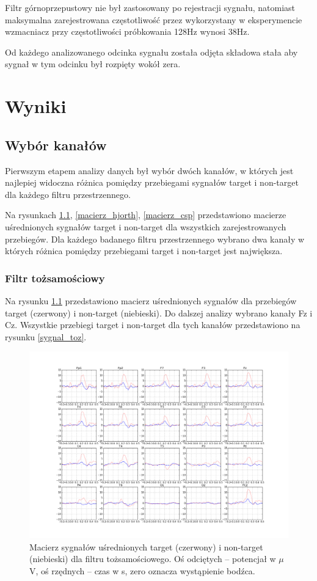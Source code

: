 \documentclass[licencjacka,openright]{pracamgr}
\begin{document}
Filtr górnoprzepustowy nie był zastosowany po rejestracji sygnału, natomiast maksymalna zarejestrowana częstotliwość przez wykorzystany w eksperymencie wzmacniacz przy częstotliwości próbkowania 128Hz wynosi 38Hz.

Od każdego analizowanego odcinka sygnału została odjęta składowa stała aby sygnał w tym odcinku był rozpięty wokół zera.

\chapter{Wyniki}
\label{wyniki}

\section{Wybór kanałów}
\label{sygnaly}

Pierwszym etapem analizy danych był wybór dwóch kanałów, w których jest najlepiej widoczna różnica pomiędzy przebiegami sygnałów target i non-target dla każdego filtru przestrzennego. 

Na rysunkach \ref{macierz_toz}, \ref{macierz_hjorth}, \ref{macierz_csp} przedstawiono macierze uśrednionych sygnałów target i non-target dla wszystkich zarejestrowanych przebiegów. Dla każdego badanego filtru przestrzennego wybrano dwa kanały w których różnica pomiędzy przebiegami target i non-target jest największa.

\subsection{Filtr tożsamościowy}

Na rysunku \ref{macierz_toz} przedstawiono macierz uśrednionych sygnałów dla przebiegów target (czerwony) i non-target (niebieski). Do dalszej analizy wybrano kanały Fz i Cz. Wszystkie przebiegi target i non-target dla tych kanałów przedstawiono na rysunku \ref{sygnal_toz}.

\begin{figure}
\centering
\includegraphics[scale=0.35, trim=10mm 25mm 10mm 25mm, clip=True]{pics/macierz_toz.png}
\caption{Macierz sygnałów uśrednionych target (czerwony) i non-target (niebieski) dla filtru tożsamościowego. Oś odciętych -- potencjał w  $\mu$V, oś rzędnych -- czas w s, zero oznacza wystąpienie bodźca.}
\label{macierz_toz}
\end{figure}
\end{document}
